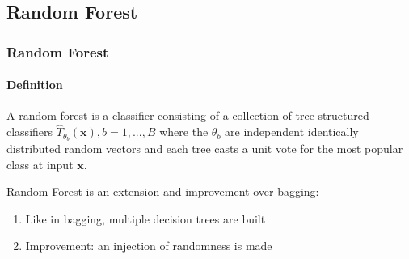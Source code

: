 \subsection{Random Forest}

\begin{frame}
\frametitle{Random Forest}
\framesubtitle{Definition}


\vspace{1ex}


\begin{definition}[by L.Breiman]
	A random forest is a classifier consisting of a collection of tree-structured classifiers ${\hat{T}_{\theta_{b}}(\textbf{x})}, b = 1,...,B$ where the $\theta_{b}$ are independent identically
	distributed random vectors and each tree casts a unit vote for the most popular class at input $\textbf{x}$.
\end{definition}
\vspace{4ex}

Random Forest is an extension and improvement over bagging:
\vspace{1ex}
\begin{enumerate}
\item Like in bagging, multiple decision trees are built
\vspace{1ex}
\item Improvement: an injection of randomness is made
\end{enumerate}

\end{frame}


